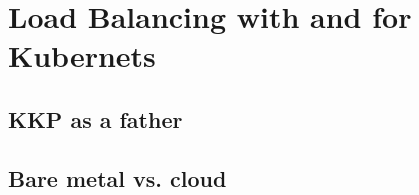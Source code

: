 \chapter{Load Balancing with and for Kubernets}

\section{KKP as a father}

\section{Bare metal vs. cloud}
